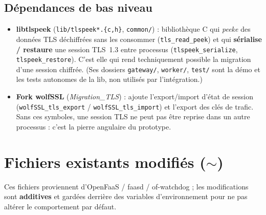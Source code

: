 \documentclass[10pt,a4paper]{article}
\newcommand{\code}[1]{\texttt{\small #1}}
\newcommand{\mod}{\textcolor{orange!75!black}{\textbf{$\sim$}}}
\begin{document}
\subsection{Dépendances de bas niveau}
\begin{itemize}
\item \textbf{libtlspeek} (\code{lib/tlspeek*.\{c,h\}}, \code{common/}) : bibliothèque C qui \emph{peeke} des
données TLS déchiffrées sans les consommer (\code{tls\_read\_peek}) et qui \textbf{sérialise / restaure}
une session TLS~1.3 entre processus (\code{tlspeek\_serialize}, \code{tlspeek\_restore}). C'est elle qui
rend techniquement possible la migration d'une session chiffrée. (Ses dossiers \code{gateway/},
\code{worker/}, \code{test/} sont la démo et les tests autonomes de la lib, non utilisés par
l'intégration.)
\item \textbf{Fork wolfSSL} (\emph{Migration\_TLS}) : ajoute l'export/import d'état de session
(\code{wolfSSL\_tls\_export} / \code{wolfSSL\_tls\_import}) et l'export des clés de trafic. Sans ces
symboles, une session TLS ne peut pas être reprise dans un autre processus : c'est la pierre angulaire
du prototype.
\end{itemize}

\section{Fichiers existants modifiés (\mod)}
Ces fichiers proviennent d'OpenFaaS / faasd / of-watchdog ; les modifications sont \textbf{additives} et
gardées derrière des variables d'environnement pour ne pas altérer le comportement par défaut.
\end{document}
